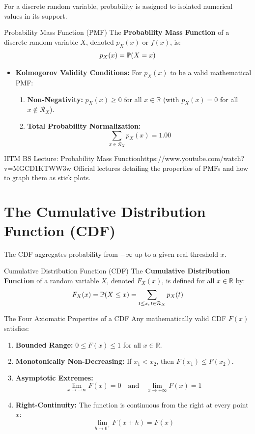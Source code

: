 For a discrete random variable, probability is assigned to isolated numerical values in its support.

\begin{definitionbox}{Probability Mass Function (PMF)}
The \textbf{Probability Mass Function} of a discrete random variable $X$, denoted $p_X(x)$ or $f(x)$, is:
$$p_X(x) = \P(X = x)$$
\begin{itemize}
    \item \textbf{Kolmogorov Validity Conditions:} For $p_X(x)$ to be a valid mathematical PMF:
    \begin{enumerate}
        \item \textbf{Non-Negativity:} $p_X(x) \ge 0$ for all $x \in \mathbb{R}$ (with $p_X(x) = 0$ for all $x \notin \mathcal{R}_X$).
        \item \textbf{Total Probability Normalization:}
        $$\sum_{x \in \mathcal{R}_X} p_X(x) = 1.00$$
    \end{enumerate}
\end{itemize}
\end{definitionbox}

\begin{videocard}{IITM BS Lecture: Probability Mass Function}{https://www.youtube.com/watch?v=MGCD1KTWW3w}
Official lectures detailing the properties of PMFs and how to graph them as stick plots.
\end{videocard}

\section{The Cumulative Distribution Function (CDF)}

The CDF aggregates probability from $-\infty$ up to a given real threshold $x$.

\begin{definitionbox}{Cumulative Distribution Function (CDF)}
The \textbf{Cumulative Distribution Function} of a random variable $X$, denoted $F_X(x)$, is defined for all $x \in \mathbb{R}$ by:
$$F_X(x) = \P(X \le x) = \sum_{t \le x, \, t \in \mathcal{R}_X} p_X(t)$$
\end{definitionbox}

\begin{theorembox}{The Four Axiomatic Properties of a CDF}
Any mathematically valid CDF $F(x)$ satisfies:
\begin{enumerate}
    \item \textbf{Bounded Range:} $0 \le F(x) \le 1$ for all $x \in \mathbb{R}$.
    \item \textbf{Monotonically Non-Decreasing:} If $x_1 < x_2$, then $F(x_1) \le F(x_2)$.
    \item \textbf{Asymptotic Extremes:}
    $$\lim_{x \to -\infty} F(x) = 0 \quad \text{and} \quad \lim_{x \to +\infty} F(x) = 1$$
    \item \textbf{Right-Continuity:} The function is continuous from the right at every point $x$:
    $$\lim_{h \to 0^+} F(x + h) = F(x)$$
\end{enumerate}
\end{theorembox}

